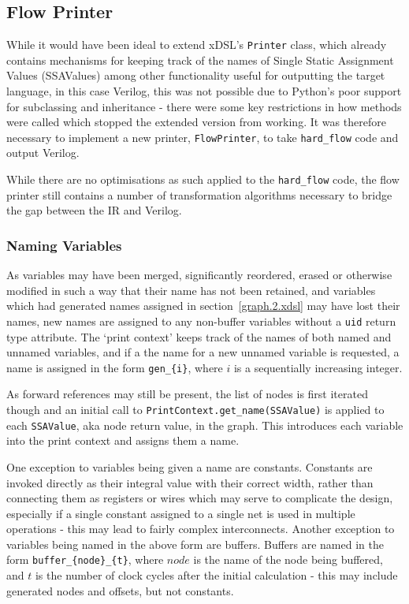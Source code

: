 \subsection{Flow Printer}\label{sect:compiling.flow_printer}
While it would have been ideal to extend xDSL's \lstinline|Printer| class, which already contains mechanisms for keeping track of the names of Single Static Assignment Values (SSAValues) among other functionality useful for outputting the target language, in this case Verilog, this was not possible due to Python's poor support for subclassing and inheritance \hyphen{} there were some key restrictions in how methods were called which stopped the extended version from working. It was therefore necessary to implement a new printer, \lstinline|FlowPrinter|, to take \lstinline|hard_flow| code and output Verilog.

While there are no optimisations as such applied to the \lstinline|hard_flow| code, the flow printer still contains a number of transformation algorithms necessary to bridge the gap between the IR and Verilog.

\subsubsection{Naming Variables}\label{naming}
As variables may have been merged, significantly reordered, erased or otherwise modified in such a way that their name has not been retained, and variables which had generated names assigned in section \ref{graph.2.xdsl} may have lost their names, new names are assigned to any non-buffer variables without a \lstinline|uid| return type attribute. The `print context' keeps track of the names of both named and unnamed variables, and if a the name for a new unnamed variable is requested, a name is assigned in the form \lstinline|gen_{i}|, where $i$ is a sequentially increasing integer.

As forward references may still be present, the list of nodes is first iterated though and an initial call to \lstinline|PrintContext.get_name(SSAValue)| is applied to each \lstinline|SSAValue|, aka node return value, in the graph. This introduces each variable into the print context and assigns them a name.

One exception to variables being given a name are constants. Constants are invoked directly as their integral value with their correct width, rather than connecting them as registers or wires which may serve to complicate the design, especially if a single constant assigned to a single net is used in multiple operations \hyphen{} this may lead to fairly complex interconnects. Another exception to variables being named in the above form are buffers. Buffers are named in the form \lstinline|buffer_{node}_{t}|, where $node$ is the name of the node being buffered, and $t$ is the number of clock cycles after the initial calculation \hyphen{} this may include generated nodes and offsets, but not constants.

